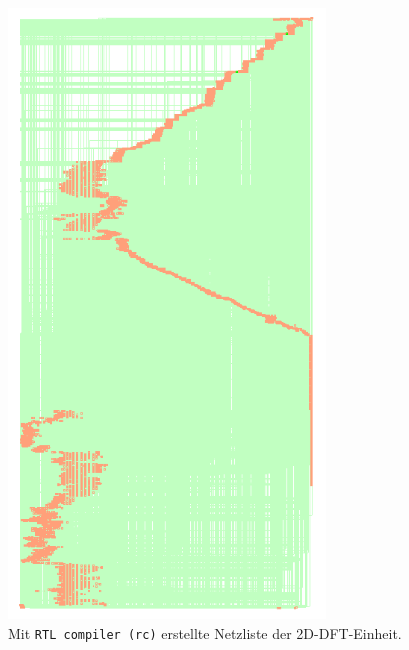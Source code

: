    \begin{figure}[ht!]
     \centering
     \includegraphics[width=0.75\textwidth]{img/2D-DFT.png}
     \caption{Mit \texttt{RTL compiler (rc)} erstellte Netzliste der 2D-DFT-Einheit.}
     \label{pic:Netzliste2D-DFT}
    \end{figure} 
 
 

